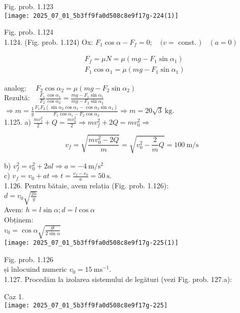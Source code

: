 Fig. prob. 1.123\\
\texttt{[image: 2025\_07\_01\_5b3ff9fa0d508c8e9f17g-224(1)]}

Fig. prob. 1.124\\
1.124. (Fig. prob. 1.124) Ox: $F_{1} \cos \alpha-F_{f}=0 ; \quad(v=$ const. $) \quad(a=0)$

$$
\begin{aligned}
& F_{f}=\mu N=\mu\left(m g-F_{1} \sin \alpha_{1}\right) \\
& F_{1} \cos \alpha_{1}=\mu\left(m g-F_{1} \sin \alpha_{1}\right)
\end{aligned}
$$

analog: $\quad F_{2} \cos \alpha_{2}=\mu\left(m g-F_{2} \sin \alpha_{2}\right)$\\
Rezultă: $\quad \frac{F_{1}}{F_{2}} \frac{\cos \alpha_{1}}{\cos \alpha_{2}}=\frac{m g-F_{1} \sin \alpha_{1}}{m g-F_{2} \sin \alpha_{2}}$\\
$\Rightarrow m=\frac{1}{g} \frac{F_{1} F_{2}\left(\sin \alpha_{2} \cos \alpha_{1}-\cos \alpha_{2} \sin \alpha_{1}\right)}{F_{1} \cos \alpha_{1}-F_{2} \cos \alpha_{2}} \Rightarrow m=20 \sqrt{3} \mathrm{~kg}$.\\
1.125. a) $\frac{m v_{f}^{2}}{2}+Q=\frac{m v_{0}^{2}}{2} \Rightarrow m v_{f}^{2}+2 Q=m v_{0}^{2} \Rightarrow$

$$
v_{f}=\sqrt{\frac{m v_{0}^{2}-2 Q}{m}}=\sqrt{v_{0}^{2}-\frac{2}{m} Q}=100 \mathrm{~m} / \mathrm{s}
$$

b) $v_{f}^{2}=v_{0}^{2}+2 a l \Rightarrow a=-4 \mathrm{~m} / \mathrm{s}^{2}$\\
c) $v_{f}=v_{0}+a t \Rightarrow t=\frac{v_{f}-v_{0}}{a}=50 \mathrm{~s}$.\\
1.126. Pentru bătaie, avem relația (Fig. prob. 1.126):\\
$d=v_{0} \sqrt{\frac{2 h}{g}}$\\
Avem: $h=l \sin \alpha ; d=l \cos \alpha$\\
Obținem:\\
$v_{0}=\cos \alpha \sqrt{\frac{g l}{2 \sin \alpha}}$\\
\texttt{[image: 2025\_07\_01\_5b3ff9fa0d508c8e9f17g-225(1)]}

Fig. prob. 1.126\\
și înlocuind numeric $v_{0}=15 \mathrm{~ms}^{-1}$.\\
1.127. Procedăm la izolarea sistemului de legături (vezi Fig. prob. 127.a):

Caz 1.\\
\texttt{[image: 2025\_07\_01\_5b3ff9fa0d508c8e9f17g-225]}

